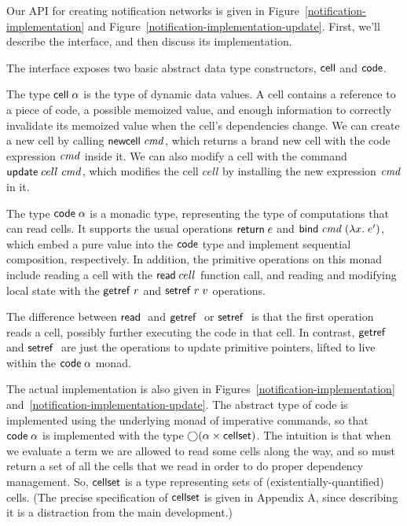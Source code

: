Our API for creating notification networks is given in
Figure~\ref{notification-implementation} and
Figure~\ref{notification-implementation-update}. First, we'll describe
the interface, and then discuss its implementation.

The interface exposes two basic abstract data type constructors, $\mathsf{cell}$
and $\mathsf{code}$.

The type $\mathsf{cell}\;{\alpha}$ is the type of dynamic data values. A
cell contains a reference to a piece of code, a possible memoized
value, and enough information to correctly invalidate its memoized
value when the cell's dependencies change. We can create a new cell by
calling $\mathsf{newcell}\; \mathit{cmd}$, which returns a brand new cell with the code
expression $\mathit{cmd}$ inside it. We can also modify a cell with the
command $\mathsf{update}\;cell\;\mathit{cmd}$, which modifies the cell $cell$ by
installing the new expression $\mathit{cmd}$ in it.

The type $\mathsf{code}\;{\alpha}$ is a monadic type, representing the type of
computations that can read cells. It supports the usual operations
$\mathsf{return}\; e$ and $\mathsf{bind}\; \mathit{cmd}\; (\lambda x.\;e')$, which embed a pure value
into the $\mathsf{code}$ type and implement sequential composition,
respectively. In addition, the primitive operations on this monad
include reading a cell with the $\mathsf{read}\; cell$ function call, and
reading and modifying local state with the $\mathsf{getref}\; r$ and $\mathsf{setref}\;
r\;v$ operations.

The difference between $\mathsf{read}\;$ and $\mathsf{getref}\;$ or $\mathsf{setref}\;$ is that
the first operation reads a cell, possibly further executing the code
in that cell. In contrast, $\mathsf{getref}\;$ and $\mathsf{setref}\;$ are just the
operations to update primitive pointers, lifted to live within the
$\mathsf{code}\;{\alpha}$ monad.
 
The actual implementation is also given in
Figures~\ref{notification-implementation} and~\ref{notification-implementation-update}. 
The abstract type of code is
implemented using the underlying monad of imperative commands, so that
$\mathsf{code}\;{\alpha}$ is implemented with the type $\bigcirc{(\alpha
  \times \mathsf{cellset})}$.  The intuition is that when we evaluate a term
we are allowed to read some cells along the way, and so must return a
set of all the cells that we read in order to do proper dependency
management. So, $\mathsf{cellset}$ is a type representing sets of
(existentially-quantified) cells.  (The precise specification of
$\mathsf{cellset}$ is given in Appendix A, since describing it is a
distraction from the main development.)

